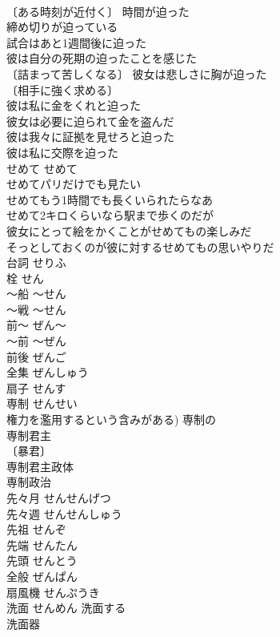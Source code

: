 \documentclass[8pt]{extreport}
\begin{document}
\begin{CJK}{UTF8}{min}
\\	〔ある時刻が近付く〕 時間が迫った 
\\	締め切りが迫っている 
\\	試合はあと1週間後に迫った 
\\	彼は自分の死期の迫ったことを感じた 
\\	〔詰まって苦しくなる〕 彼女は悲しさに胸が迫った 
\\	〔相手に強く求める〕
\\	彼は私に金をくれと迫った 
\\	彼女は必要に迫られて金を盗んだ 
\\	彼は我々に証拠を見せろと迫った 
\\	彼は私に交際を迫った 
\\	せめて	せめて	
\\	せめてパリだけでも見たい 
\\	せめてもう1時間でも長くいられたらなあ 
\\	せめて2キロくらいなら駅まで歩くのだが 
\\	彼女にとって絵をかくことがせめてもの楽しみだ 
\\	そっとしておくのが彼に対するせめてもの思いやりだ 
\\	台詞	せりふ	
\\	栓	せん	
\\	～船	～せん	
\\	～戦	～せん	
\\	前～	ぜん～	
\\	～前	～ぜん	
\\	前後	ぜんご	
\\	全集	ぜんしゅう	
\\	扇子	せんす	
\\	専制	せんせい	
\\	権力を濫用するという含みがある) 専制の 
\\	専制君主 
\\	〔暴君〕
\\	専制君主政体 
\\	専制政治 
\\	先々月	せんせんげつ	
\\	先々週	せんせんしゅう	
\\	先祖	せんぞ	
\\	先端	せんたん	
\\	先頭	せんとう	
\\	全般	ぜんぱん	
\\	扇風機	せんぷうき	
\\	洗面	せんめん	洗面する 
\\	洗面器 

\end{CJK}
\end{document}
